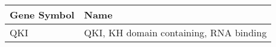 \begin{tabular}{ll}
\toprule
Gene Symbol &                                   Name \\
\midrule
        QKI & QKI, KH domain containing, RNA binding \\
\bottomrule
\end{tabular}
